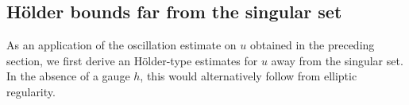 \documentclass[12pt]{article}
\theoremstyle{definition}
\theoremstyle{remark}
\numberwithin{equation}{section}
\begin{document}




\subsection{H\"older bounds far from the singular set}
\label{SubsectionFarSing}

As an application of the oscillation estimate on $u$ obtained in the preceding section, we first derive an H\"older-type
estimates for $u$ away from the singular set. In the absence of a gauge $h$, this would alternatively follow from
elliptic regularity.
\end{document}
